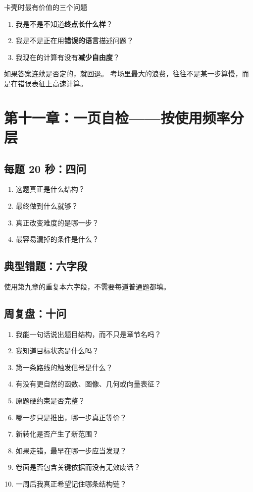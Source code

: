 \documentclass[11pt,a4paper]{ctexart}
\begin{document}
\begin{corebox}{卡壳时最有价值的三个问题}
\begin{enumerate}
  \item 我是不是不知道\textbf{终点长什么样}？
  \item 我是不是正在用\textbf{错误的语言}描述问题？
  \item 我现在的计算有没有\textbf{减少自由度}？
\end{enumerate}
\end{corebox}

如果答案连续是否定的，就回退。
考场里最大的浪费，往往不是某一步算慢，而是在错误表征上高速计算。

\section{第十一章：一页自检——按使用频率分层}

\subsection{每题 20 秒：四问}

\begin{enumerate}
  \item 这题真正是什么结构？
  \item 最终做到什么就够？
  \item 真正改变难度的是哪一步？
  \item 最容易漏掉的条件是什么？
\end{enumerate}

\subsection{典型错题：六字段}

使用第九章的重复本六字段，不需要每道普通题都填。

\subsection{周复盘：十问}

\begin{enumerate}
  \item 我能一句话说出题目结构，而不只是章节名吗？
  \item 我知道目标状态是什么吗？
  \item 第一条路线的触发信号是什么？
  \item 有没有更自然的函数、图像、几何或向量表征？
  \item 原题硬约束是否完整？
  \item 哪一步只是推出，哪一步真正等价？
  \item 新转化是否产生了新范围？
  \item 如果走错，最早在哪一步应当发现？
  \item 卷面是否包含关键依据而没有无效废话？
  \item 一周后我真正希望记住哪条结构链？
\end{enumerate}
\end{document}
